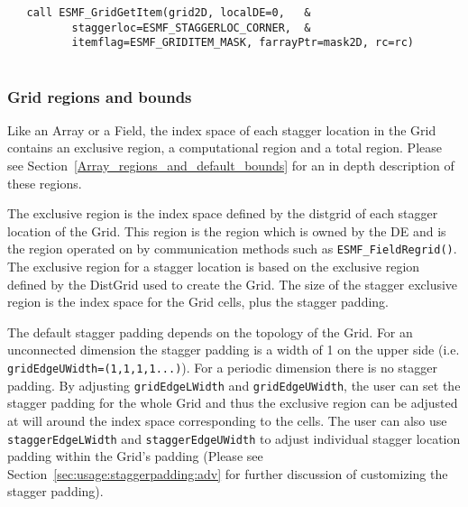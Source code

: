  \begin{verbatim}
   call ESMF_GridGetItem(grid2D, localDE=0,   &
          staggerloc=ESMF_STAGGERLOC_CORNER,  &
          itemflag=ESMF_GRIDITEM_MASK, farrayPtr=mask2D, rc=rc)
 
\end{verbatim}
 

  \subsubsection{Grid regions and bounds}
  \label{sec:grid:usage:bounds}
  
   \begin{sloppypar}
   Like an Array or a Field, the index space of each
   stagger location in the Grid contains an exclusive region, a
   computational region and a total region. Please
   see Section~\ref{Array_regions_and_default_bounds}
   for an in depth description of these regions.
   \end{sloppypar}
  
   \begin{sloppypar}
   The exclusive region is the index space defined by the
   distgrid of each stagger location of the Grid. This region
   is the region which is owned by the DE and is the region
   operated on by communication methods such as {\tt ESMF\_FieldRegrid()}.
   The exclusive region for a stagger location is based on the
   exclusive region defined by the DistGrid used to create the Grid.
   The size of the stagger exclusive region is the index space for the
   Grid cells, plus the stagger padding.
   \end{sloppypar}
  
   The default stagger padding depends on the topology of the Grid.
   For an unconnected dimension the stagger padding is a width
   of 1 on the upper side (i.e. {\tt gridEdgeUWidth=(1,1,1,1...)}).
   For a periodic dimension there is no stagger padding.
   By adjusting {\tt gridEdgeLWidth} and {\tt gridEdgeUWidth}, the
   user can set the stagger padding for the whole Grid and
   thus the exclusive region can be adjusted at will around the
   index space corresponding to the cells. The user can
   also use {\tt staggerEdgeLWidth} and {\tt staggerEdgeUWidth} to
   adjust individual stagger location padding within the
   Grid's padding (Please see Section~\ref{sec:usage:staggerpadding:adv} for
   further discussion of customizing the stagger padding).
  
